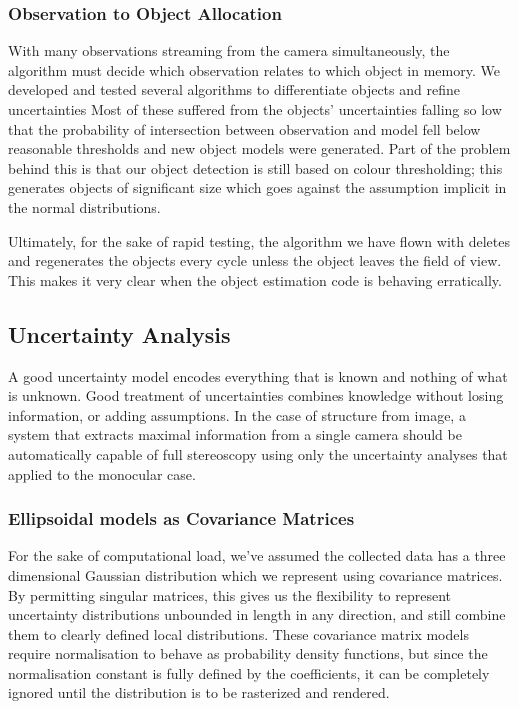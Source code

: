 \documentclass[a4paper, 11pt, titlepage]{article}
\begin{document}
    \subsubsection{Observation to Object Allocation}
      \label{sec:objectAllocation}
      With many observations streaming from the camera simultaneously, the algorithm must decide which observation relates to which object in memory.  We developed and tested several algorithms to differentiate objects and refine uncertainties
      Most of these suffered from the objects' uncertainties falling so low that the probability of intersection between observation and model fell below reasonable thresholds and new object models were generated.  Part of the problem behind this is that our object detection is still based on colour thresholding; this generates objects of significant size which goes against the assumption implicit in the normal distributions.

      Ultimately, for the sake of rapid testing, the algorithm we have flown with deletes and regenerates the objects every cycle unless the object leaves the field of view.  This makes it very clear when the object estimation code is behaving erratically.

  \subsection{Uncertainty Analysis}
    A good uncertainty model encodes everything that is known and nothing of what is unknown.
    Good treatment of uncertainties combines knowledge without losing information, or adding assumptions.
    In the case of structure from image, a system that extracts maximal information from a single camera should be automatically capable of full stereoscopy using only the uncertainty analyses that applied to the monocular case.
    \subsubsection{Ellipsoidal models as Covariance Matrices}
      For the sake of computational load, we've assumed the collected data has a three dimensional Gaussian distribution which we represent using covariance matrices.
      By permitting singular matrices, this gives us the flexibility to represent uncertainty distributions unbounded in length in any direction, and still combine them to clearly defined local distributions.
      These covariance matrix models require normalisation to behave as probability density functions, but since the normalisation constant is fully defined by the coefficients, it can be completely ignored until the distribution is to be rasterized and rendered.
\end{document}
